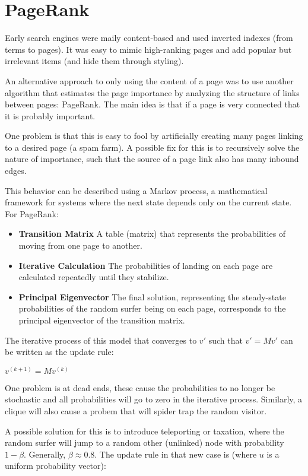 \section{PageRank}

Early search engines were maily content-based and used
inverted indexes (from terms to pages). It was easy to
mimic high-ranking pages and add popular but irrelevant
items (and hide them through styling).

An alternative approach to only using the content of a
page was to use another algorithm that estimates the page
importance by analyzing the structure of links between
pages: PageRank. The main idea is that if a page is very
connected that it is probably important.

One problem is that this is easy to fool by artificially
creating many pages linking to a desired page (a spam farm).
A possible fix for this is to recursively solve the nature
of importance, such that the source of a page link also
has many inbound edges.

This behavior can be described using a Markov process, a mathematical
framework for systems where the next state depends only on the
current state. For PageRank:

\begin{itemize}
  \item \textbf{Transition Matrix} A table (matrix) that represents
    the probabilities of moving from one page to another.
  \item \textbf{Iterative Calculation} The probabilities of landing
    on each page are calculated repeatedly until they stabilize.
  \item \textbf{Principal Eigenvector} The final solution,
    representing the steady-state probabilities of the random surfer
    being on each page, corresponds to the principal eigenvector of
    the transition matrix.
\end{itemize}

The iterative process of this model that converges to $v'$ such that $v' = Mv'$
can be written as the update rule:

$v^{(k+1)} = Mv^{(k)}$

One problem is at dead ends, these cause the probabilities to no
longer be stochastic and all probabilities will go to zero in the
iterative process. Similarly, a clique will also cause a probem that
will spider trap the random visitor.

A possible solution for this is to introduce teleporting or taxation,
where the random surfer will jump to a random other (unlinked) node
with probability $1 - \beta$. Generally, $\beta \approx 0.8$. The
update rule in that new case is (where $u$ is a uniform probability
vector):

